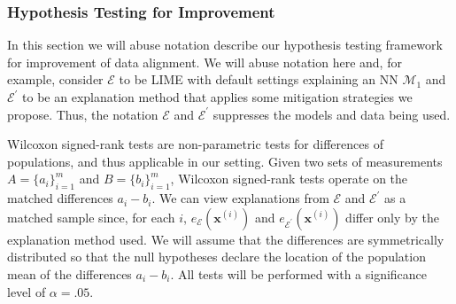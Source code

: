 \documentclass[mnsc,blindrev]{informs3}
\newcommand{\mE}{\mathcal{E}}
\begin{document}
        \subsubsection{Hypothesis Testing for Improvement}
            \label{apx_sec:hypothesis_testing}
            In this section we will abuse notation describe our hypothesis testing framework for improvement of data alignment. We will abuse notation here and, for example, consider $\mE$ to be LIME with default settings explaining an NN $\mathcal{M}_1$ and $\mE^\prime$ to be an explanation method that applies some mitigation strategies we propose. Thus, the notation $\mE$ and $\mE^\prime$ suppresses the models and data being used.
            
            Wilcoxon signed-rank tests are non-parametric tests for differences of populations, and thus applicable in our setting. Given two sets of measurements $A=\{a_i\}_{i=1}^m$ and $B=\{b_i\}_{i=1}^m$, Wilcoxon signed-rank tests operate on the matched differences $a_i-b_i$. We can view explanations from $\mE$ and $\mE^\prime$ as a matched sample since, for each $i$, $e_{\mE}(\mathbf{x}^{(i)})$ and $e_{\mE^\prime}(\mathbf{x}^{(i)})$ differ only by the explanation method used. We will assume that the differences are symmetrically distributed so that the null hypotheses declare the location of the population mean of the differences $a_i - b_i$. All tests will be performed with a significance level of $\alpha=.05$.
   
\end{document}
